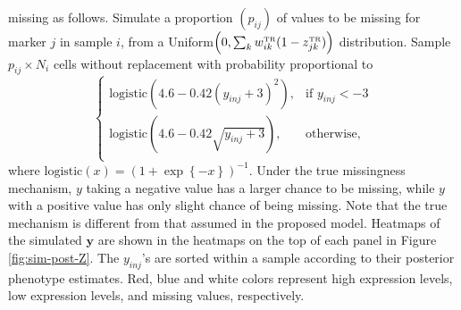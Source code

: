 \documentclass[12pt,]{article}
\newcommand{\p}[1]{\left(#1\right)}
\newcommand{\bc}[1]{ \left\{#1\right\} }
\def\beginmyfig{\begin{figure}[H]\center}
\def\endmyfig{\end{figure}}
\def\y{\bm{y}}
\newcommand{\true}{{\mbox{\tiny TR}}}
\def\beginmyfig{\begin{figure}[H]\center}
\def\endmyfig{\end{figure}}
\begin{document}
missing as follows. Simulate a proportion $(p_{ij})$ of values to be missing
for marker $j$ in sample $i$, from a
Uniform$\p{0, \sum_k w^\true_{ik}(1-z^\true_{jk})}$ distribution. Sample
$p_{ij}\times N_i$ cells without replacement with probability proportional to
$$
\begin{cases}
  \text{logistic}\p{4.6 - 0.42(y_{inj}+3)^2}, & \text{if } y_{inj} < -3 \\
  \text{logistic}\p{4.6 - 0.42\sqrt{y_{inj}+3}}, & \text{otherwise,} \\
\end{cases}
$$
%
where $\text{logistic}(x) = (1 + \exp\bc{-x})^{-1}$.
Under the true missingness mechanism, $y$ taking a negative value has a larger
chance to be missing, while $y$ with a positive value has only slight chance of
being missing.  Note that the true mechanism is different from that assumed in
the proposed model. Heatmaps of the simulated $\y$ are shown in the heatmaps
on the top of each panel in Figure \ref{fig:sim-post-Z}.
The $y_{inj}$'s are sorted within a sample according to their posterior
phenotype estimates. Red, blue and white colors represent high expression
levels, low expression levels, and missing values, respectively.

\end{document}
